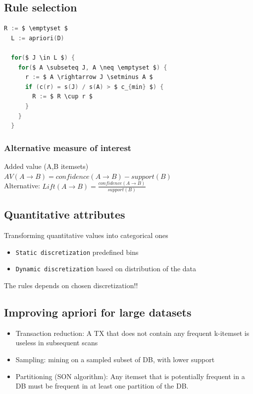 \subsection{Rule selection}
\begin{lstlisting}[language=C,mathescape=true]
  R := $ \emptyset $
  L := apriori(D)

  for($ J \in L $) {
    for($ A \subseteq J, A \neq \emptyset $) {
      r := $ A \rightarrow J \setminus A $
      if (c(r) = s(J) / s(A) > $ c_{min} $) {
        R := $ R \cup r $
      }
    }
  }
\end{lstlisting}

\subsubsection{Alternative measure of interest}
Added value (A,B itemsets)
$ AV(A \rightarrow B) = confidence(A \rightarrow B) - support(B) $ \\

Alternative: $ Lift(A \rightarrow B) = \frac{confidence(A \rightarrow
  B)}{support(B)} $

\subsection{Quantitative attributes}
Transforming quantitative values into categorical ones
\begin{itemize}
\item \texttt{Static discretization} predefined bins
\item \texttt{Dynamic discretization} based on distribution of the
  data
\end{itemize}

The rules depends on chosen discretization!!

\subsection{Improving apriori for large datasets}
\begin{itemize}
\item Transaction reduction: A TX that does not contain any frequent
  k-itemset is useless in subsequent scans
\item Sampling: mining on a sampled subset of DB, with lower support
\item Partitioning (SON algorithm): Any itemset that is potentially
  frequent in a DB must be frequent in at least one partition of the
  DB.
\end{itemize}

